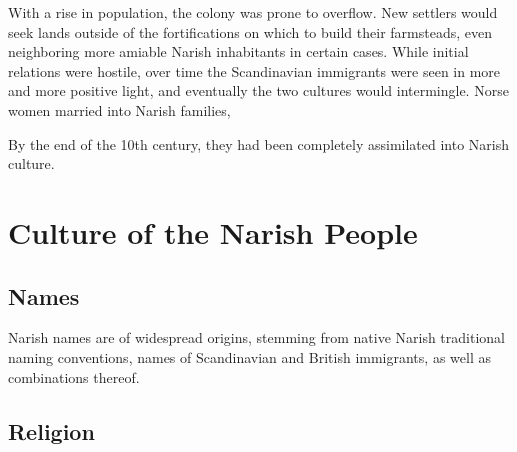 \documentclass[a4paper,11pt,twoside,openright]{memoir}
\begin{document}
With a rise in population, the colony was prone to overflow. New settlers would seek lands outside of the fortifications on which to build their farmsteads, even neighboring more amiable Narish inhabitants in certain cases. While initial relations were hostile, over time the Scandinavian immigrants were seen in more and more positive light, and eventually the two cultures would intermingle. Norse women married into Narish families, 

By the end of the 10th century, they had been completely assimilated into Narish culture.


\part{Culture of the Narish People}

\chapter{Names}

Narish names are of widespread origins, stemming from native Narish traditional naming conventions, names of Scandinavian and British immigrants, as well as combinations thereof.

\chapter{Religion}
\end{document}
